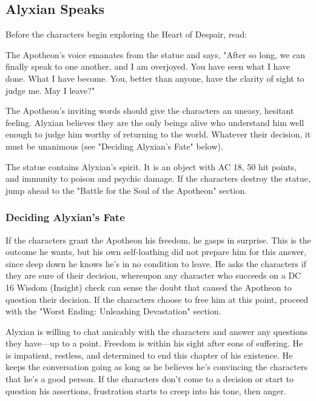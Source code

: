 \documentclass[letterpaper, 11pt, bg=full, twocolumn]{dndbook}
\begin{document}
\subsection{Alyxian Speaks}

Before the characters begin exploring the Heart of Despair, read:

\begin{DndReadAloud}
The Apotheon's voice emanates from the statue and says, "After so long, we can finally speak to one another, and I am overjoyed. You have seen what I have done. What I have become. You, better than anyone, have the clarity of sight to judge me. May I leave?"
\end{DndReadAloud}

The Apotheon's inviting words should give the characters an uneasy, hesitant feeling. Alyxian believes they are the only beings alive who understand him well enough to judge him worthy of returning to the world. Whatever their decision, it must be unanimous (see "Deciding Alyxian's Fate" below).

The statue contains Alyxian's spirit. It is an object with AC 18, 50 hit points, and immunity to poison and psychic damage. If the characters destroy the statue, jump ahead to the "Battle for the Soul of the Apotheon" section.

\subsubsection{Deciding Alyxian's Fate}

If the characters grant the Apotheon his freedom, he gasps in surprise. This is the outcome he wants, but his own self-loathing did not prepare him for this answer, since deep down he knows he's in no condition to leave. He asks the characters if they are sure of their decision, whereupon any character who succeeds on a DC 16 Wisdom (Insight) check can sense the doubt that caused the Apotheon to question their decision. If the characters choose to free him at this point, proceed with the "Worst Ending: Unleashing Devastation" section.

Alyxian is willing to chat amicably with the characters and answer any questions they have---up to a point. Freedom is within his sight after eons of suffering. He is impatient, restless, and determined to end this chapter of his existence. He keeps the conversation going as long as he believes he's convincing the characters that he's a good person. If the characters don't come to a decision or start to question his assertions, frustration starts to creep into his tone, then anger.
\end{document}

